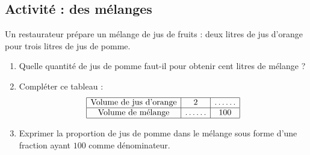 
\subsection*{Activité : des mélanges}

Un restaurateur prépare un mélange de jus de fruits : deux litres de jus d'orange pour trois litres de jus de pomme. 
\begin{enumerate}
    \item
        Quelle quantité de jus de pomme faut-il pour obtenir cent litres de mélange ?
    \item
        Compléter ce tableau :
        \begin{equation*}
            \begin{array}[]{|c|c|c|}
                \hline
                \text{Volume de jus d'orange}&2&\ldots\ldots\\
                \hline
                \text{Volume de mélange}&\ldots\ldots&100\\
                \hline
            \end{array}
        \end{equation*}
    \item
        Exprimer la proportion de jus de pomme dans le mélange sous forme d'une fraction ayant \( 100\) comme dénominateur.
\end{enumerate}

